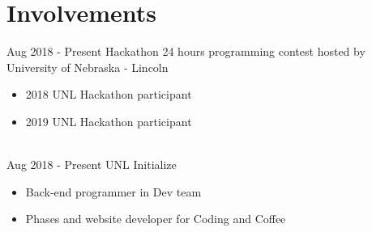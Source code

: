 \documentclass[letterpaper]{twentysecondcv} %
\begin{document}
\section{Involvements}
\begin{twenty}
	
    \twentyitem
    	{Aug 2018 - }
		{Present}
        {Hackathon}
        {}
        {24 hours programming contest hosted by University of Nebraska - Lincoln}
        {
        {\begin{itemize}
        \item 2018 UNL Hackathon participant
        \item 2019 UNL Hackathon participant
		\end{itemize}}
        }
    \\
    \twentyitem
    	{Aug 2018 -}
		{Present}
        {UNL Initialize}
        {}
        {}
        {
        {\begin{itemize}
        \item Back-end programmer in Dev team 
        \item Phases and website developer for Coding and Coffee
		\end{itemize}}
        }
\end{twenty}
\end{document}
